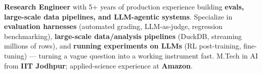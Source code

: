 \documentclass[letter,10pt]{article}
\begin{document}

\textbf{Research Engineer} with 5+ years of production experience building \textbf{evals, large-scale data pipelines, and LLM-agentic systems}.
Specialize in \textbf{evaluation harnesses} (automated grading, LLM-as-judge, regression benchmarking), \textbf{large-scale data/analysis pipelines} (DuckDB, streaming millions of rows), and \textbf{running experiments on LLMs} (RL post-training, fine-tuning) — turning a vague question into a working instrument fast.
M.Tech in AI from \textbf{IIT Jodhpur}; applied-science experience at \textbf{Amazon}.
\end{document}

